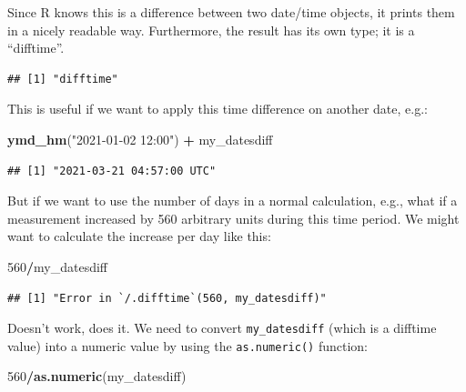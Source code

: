 \documentclass[
  12pt,
  krantz2]{krantz}
\makeatletter
\newenvironment{Shaded}{\begin{snugshade}}{\end{snugshade}}
\newcommand{\DecValTok}[1]{\textcolor[rgb]{0.00,0.00,0.81}{#1}}
\newcommand{\KeywordTok}[1]{\textcolor[rgb]{0.13,0.29,0.53}{\textbf{#1}}}
\newcommand{\NormalTok}[1]{#1}
\newcommand{\OperatorTok}[1]{\textcolor[rgb]{0.81,0.36,0.00}{\textbf{#1}}}
\newcommand{\StringTok}[1]{\textcolor[rgb]{0.31,0.60,0.02}{#1}}
\newenvironment{kframe}{%
\medskip{}
\setlength{\fboxsep}{.8em}
 \def\at@end@of@kframe{}%
 \ifinner\ifhmode%
  \def\at@end@of@kframe{\end{minipage}}%
  \begin{minipage}{\columnwidth}%
 \fi\fi%
 \def\FrameCommand##1{\hskip\@totalleftmargin \hskip-\fboxsep
 \colorbox{shadecolor}{##1}\hskip-\fboxsep
     \hskip-\linewidth \hskip-\@totalleftmargin \hskip\columnwidth}%
 \MakeFramed {\advance\hsize-\width
   \@totalleftmargin\z@ \linewidth\hsize
   \@setminipage}}%
 {\par\unskip\endMakeFramed%
 \at@end@of@kframe}
\renewenvironment{Shaded}{\begin{kframe}}{\end{kframe}}
\makeatother
\begin{document}
Since R knows this is a difference between two date/time objects, it prints them in a nicely readable way.
Furthermore, the result has its own type; it is a ``difftime''.

\begin{Shaded}
\end{Shaded}

\begin{verbatim}
## [1] "difftime"
\end{verbatim}

This is useful if we want to apply this time difference on another date, e.g.:

\begin{Shaded}
\begin{Highlighting}[]
\KeywordTok{ymd_hm}\NormalTok{(}\StringTok{"2021-01-02 12:00"}\NormalTok{) }\OperatorTok{+}\StringTok{ }\NormalTok{my_datesdiff}
\end{Highlighting}
\end{Shaded}

\begin{verbatim}
## [1] "2021-03-21 04:57:00 UTC"
\end{verbatim}

But if we want to use the number of days in a normal calculation, e.g., what if a measurement increased by 560 arbitrary units during this time period.
We might want to calculate the increase per day like this:

\begin{Shaded}
\begin{Highlighting}[]
\DecValTok{560}\OperatorTok{/}\NormalTok{my_datesdiff}
\end{Highlighting}
\end{Shaded}

\begin{verbatim}
## [1] "Error in `/.difftime`(560, my_datesdiff)"
\end{verbatim}

Doesn't work, does it.
We need to convert \texttt{my\_datesdiff} (which is a difftime value) into a numeric value by using the \texttt{as.numeric()} function:

\begin{Shaded}
\begin{Highlighting}[]
\DecValTok{560}\OperatorTok{/}\KeywordTok{as.numeric}\NormalTok{(my_datesdiff)}
\end{Highlighting}
\end{Shaded}
\end{document}
